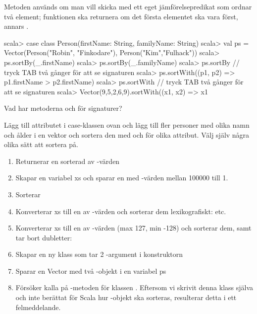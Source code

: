 Metoden  används om man vill skicka med ett eget jämförelsepredikat som ordnar två element; funktionen ska returnera  om det första elementet ska vara först, annars .

\begin{REPL}
scala> case class Person(firstName: String, familyName: String)
scala> val ps = Vector(Person("Robin", "Finkodare"), Person("Kim","Fulhack"))
scala> ps.sortBy(_.firstName)
scala> ps.sortBy(_.familyName)
scala> ps.sortBy  // tryck TAB två gånger för att se signaturen
scala> ps.sortWith((p1, p2) => p1.firstName > p2.firstName)
scala> ps.sortWith  // tryck TAB två gånger för att se signaturen
scala> Vector(9,5,2,6,9).sortWith((x1, x2) => x1 %
\end{REPL}
Vad har metoderna  och  för signaturer?

\Subtask Lägg till attributet  i case-klassen  ovan och lägg till fler personer med olika namn och ålder i en vektor och sortera den med  och  för olika attribut. Välj själv några olika sätt att sortera på.



\SOLUTION


\TaskSolved \what


\SubtaskSolved
\begin{enumerate}
\item Returnerar en sorterad  av -värden
\item Skapar en variabel xs och sparar en  med -värden mellan 100000 till 1.
\item Sorterar 
\item Konverterar xs till en  av -värden och sorterar dem lexikografiskt:  etc.
\item Konverterar xs till en  av -värden (max 127, min -128) och sorterar dem, samt tar bort dubletter: 
\item Skapar en ny klass  som tar 2 -argument i konstruktorn
\item Sparar en Vector med två -objekt i en variabel ps
\item Försöker kalla på -metoden för klassen . Eftersom vi skrivit denna klass själva och inte berättat för Scala hur -objekt ska sorteras, resulterar detta i ett felmeddelande.
\end{enumerate}

